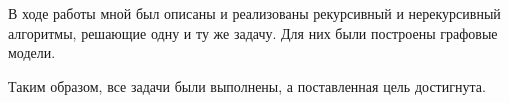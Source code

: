 
В ходе работы мной был описаны и реализованы рекурсивный и нерекурсивный алгоритмы, решающие одну и ту же задачу. Для них были построены графовые модели.

Таким образом, все задачи были выполнены, а поставленная цель достигнута.